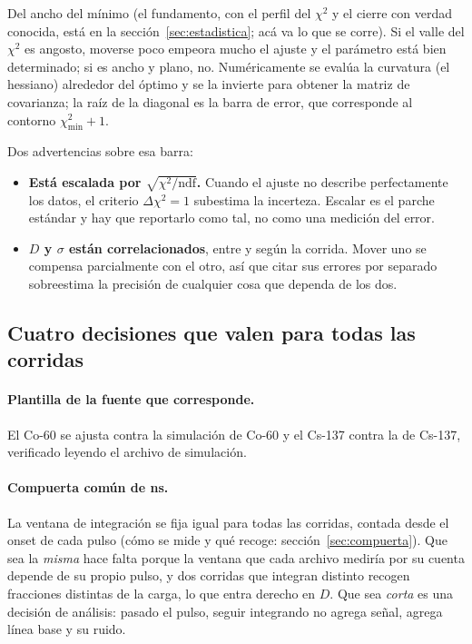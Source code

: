 \documentclass[11pt,a4paper]{article}
\begin{document}
Del ancho del mínimo (el fundamento, con el perfil del $\chi^2$ y el cierre
con verdad conocida, está en la sección~\ref{sec:estadistica}; acá va lo que
se corre). Si el valle del $\chi^2$ es angosto, moverse poco empeora
mucho el ajuste y el parámetro está bien determinado; si es ancho y plano, no.
Numéricamente se evalúa la curvatura (el hessiano) alrededor del óptimo y se la
invierte para obtener la matriz de covarianza; la raíz de la diagonal es la
barra de error, que corresponde al contorno $\chi^2_{\min} + 1$.

Dos advertencias sobre esa barra:

\begin{itemize}
\item \textbf{Está escalada por $\sqrt{\chi^2/\text{ndf}}$.} Cuando el ajuste
      no describe perfectamente los datos, el criterio $\Delta\chi^2 = 1$
      subestima la incerteza. Escalar es el parche estándar y hay que
      reportarlo como tal, no como una medición del error.
\item \textbf{$D$ y $\sigma$ están correlacionados}, entre \CorrMin{} y
      \CorrMax{} según la corrida. Mover uno se compensa parcialmente con el
      otro, así que citar sus errores por separado sobreestima la precisión de
      cualquier cosa que dependa de los dos.
\end{itemize}

\subsection{Cuatro decisiones que valen para todas las corridas}
\label{sec:decisiones}

\paragraph{Plantilla de la fuente que corresponde.} El Co-60 se ajusta contra
la simulación de Co-60 y el Cs-137 contra la de Cs-137, verificado leyendo el
archivo de simulación.

\paragraph{Compuerta común de \PostFijo{} ns.} La ventana de integración se
fija igual para todas las corridas, contada desde el onset de cada pulso
(cómo se mide y qué recoge: sección~\ref{sec:compuerta}). Que
sea la \emph{misma} hace falta porque la ventana que cada archivo mediría por
su cuenta depende de su propio pulso, y dos corridas que integran distinto
recogen fracciones distintas de la carga, lo que entra derecho en $D$. Que sea
\emph{corta} es una decisión de análisis: pasado el pulso, seguir integrando no
agrega señal, agrega línea base y su ruido.
\end{document}
